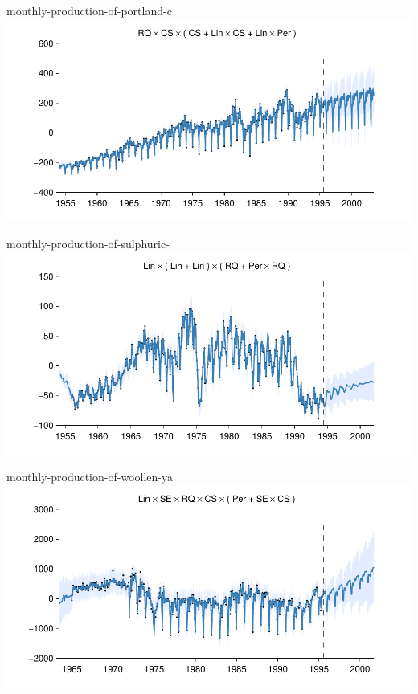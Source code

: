     
\begin{frame}{monthly-production-of-portland-c}
  \center
  \includegraphics[width=1.0\textwidth]{figures/monthly-production-of-portland-c/monthly-production-of-portland-c_all}
\end{frame}  


    
\begin{frame}{monthly-production-of-sulphuric-}
  \center
  \includegraphics[width=1.0\textwidth]{figures/monthly-production-of-sulphuric-/monthly-production-of-sulphuric-_all}
\end{frame}  


    
\begin{frame}{monthly-production-of-woollen-ya}
  \center
  \includegraphics[width=1.0\textwidth]{figures/monthly-production-of-woollen-ya/monthly-production-of-woollen-ya_all}
\end{frame}  


